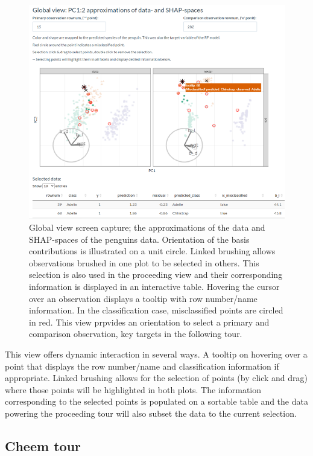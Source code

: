\documentclass[
]{article}
\begin{document}
\begin{figure}

{\centering \includegraphics[width=1\linewidth]{./figures/global_view_penguins} 

}

\caption{Global view screen capture; the approximations of the data and SHAP-spaces of the penguins data. Orientation of the basis contributions is illustrated on a unit circle. Linked brushing allows observations brushed in one plot to be selected in others. This selection is also used in the proceeding view and their corresponding information is displayed in an interactive table. Hovering the cursor over an observation displays a tooltip with row number/name information. In the classification case, misclassified points are circled in red. This view prpvides an orientation to select a primary and comparison observation, key targets in the following tour.}\label{fig:globalview}
\end{figure}

This view offers dynamic interaction in several ways. A tooltip on hovering over a point that displays the row number/name and classification information if appropriate. Linked brushing allows for the selection of points (by click and drag) where those points will be highlighted in both plots. The information corresponding to the selected points is populated on a sortable table and the data powering the proceeding tour will also subset the data to the current selection.

\hypertarget{cheem-tour}{%
\subsection{Cheem tour}\label{cheem-tour}}
\end{document}
